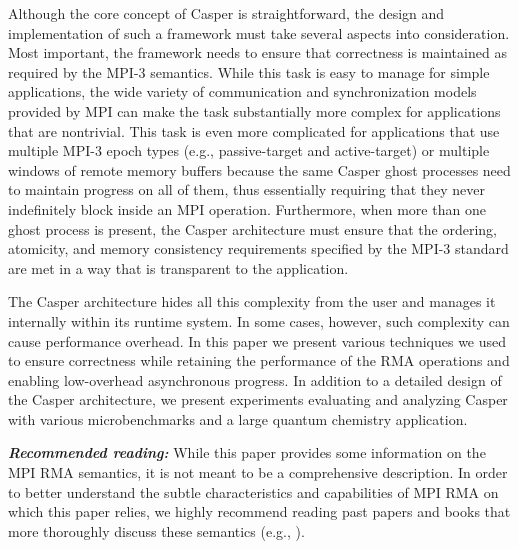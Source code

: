 Although the core concept of Casper is straightforward, the design and
implementation of such a framework must take several aspects into
consideration.  Most important, the framework needs to ensure that
correctness is maintained as required by the MPI-3 semantics.  While this task is
easy to manage for simple applications, the wide variety of
communication and synchronization models provided by MPI can make the task
substantially more complex for applications that are nontrivial.
This task is even more complicated for applications that use multiple
MPI-3 epoch types (e.g., passive-target and active-target) or multiple
windows of remote memory buffers because the same Casper ghost
processes need to maintain progress on all of them, thus essentially
requiring that they never indefinitely block inside an MPI operation.
Furthermore, when more than one ghost process is present, the Casper
architecture must ensure that the ordering, atomicity, and memory
consistency requirements specified by the MPI-3 standard are met in a
way that is transparent to the application.

The Casper architecture hides all this complexity from the user and
manages it internally within its runtime system.  In some
cases, however, such complexity can cause performance overhead.  In this paper
we present various techniques we used to ensure correctness while
retaining the performance of the RMA operations and enabling
low-overhead asynchronous progress.  In addition to a detailed design
of the Casper architecture, we present
experiments evaluating and analyzing Casper with various
microbenchmarks and a large quantum chemistry application.

\textbf{\em Recommended reading:} While this paper provides some
information on the MPI RMA semantics, it is not meant to be a
comprehensive description.
In order to better understand the subtle
characteristics and capabilities of MPI RMA on which this paper
relies,
we highly recommend
reading past papers and books that more
thoroughly discuss these semantics (e.g., \cite{hoefler13:mpi3-rma,
  gropp99:using-mpi-2}).
